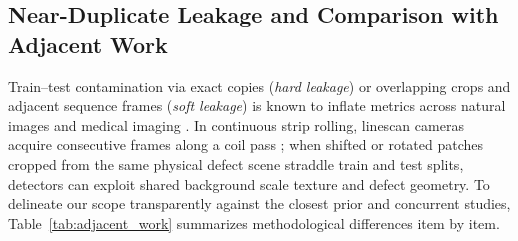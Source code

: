\documentclass[pdflatex,sn-apa]{sn-jnl}
\begin{document}
\subsection{Near-Duplicate Leakage and Comparison with Adjacent Work}
Train--test contamination via exact copies (\textit{hard leakage}) or overlapping crops and adjacent sequence frames (\textit{soft leakage}) is known to inflate metrics across natural images \citep{barz2020cifair,recht2019imagenet,ramos2025leakage} and medical imaging \citep{tampu2022inflation,roberts2021common,varoquaux2022evaluating}. In continuous strip rolling, linescan cameras acquire consecutive frames along a coil pass \citep{technologies2026review,molleda2026edge}; when shifted or rotated patches cropped from the same physical defect scene straddle train and test splits, detectors can exploit shared background scale texture and defect geometry. To delineate our scope transparently against the closest prior and concurrent studies, Table~\ref{tab:adjacent_work} summarizes methodological differences item by item.
\end{document}
